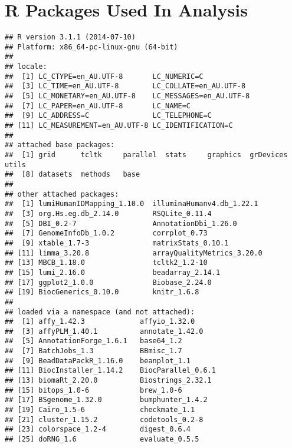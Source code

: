 \documentclass{article}\usepackage{knitr}
\begin{document}
\section*{R Packages Used In Analysis}
\begin{knitrout}\footnotesize
{}\color{fgcolor}\begin{kframe}
\begin{alltt}
\hlstd{()}
\end{alltt}
\begin{verbatim}
## R version 3.1.1 (2014-07-10)
## Platform: x86_64-pc-linux-gnu (64-bit)
## 
## locale:
##  [1] LC_CTYPE=en_AU.UTF-8       LC_NUMERIC=C              
##  [3] LC_TIME=en_AU.UTF-8        LC_COLLATE=en_AU.UTF-8    
##  [5] LC_MONETARY=en_AU.UTF-8    LC_MESSAGES=en_AU.UTF-8   
##  [7] LC_PAPER=en_AU.UTF-8       LC_NAME=C                 
##  [9] LC_ADDRESS=C               LC_TELEPHONE=C            
## [11] LC_MEASUREMENT=en_AU.UTF-8 LC_IDENTIFICATION=C       
## 
## attached base packages:
##  [1] grid      tcltk     parallel  stats     graphics  grDevices utils    
##  [8] datasets  methods   base     
## 
## other attached packages:
##  [1] lumiHumanIDMapping_1.10.0  illuminaHumanv4.db_1.22.1 
##  [3] org.Hs.eg.db_2.14.0        RSQLite_0.11.4            
##  [5] DBI_0.2-7                  AnnotationDbi_1.26.0      
##  [7] GenomeInfoDb_1.0.2         corrplot_0.73             
##  [9] xtable_1.7-3               matrixStats_0.10.1        
## [11] limma_3.20.8               arrayQualityMetrics_3.20.0
## [13] MBCB_1.18.0                tcltk2_1.2-10             
## [15] lumi_2.16.0                beadarray_2.14.1          
## [17] ggplot2_1.0.0              Biobase_2.24.0            
## [19] BiocGenerics_0.10.0        knitr_1.6.8               
## 
## loaded via a namespace (and not attached):
##  [1] affy_1.42.3             affyio_1.32.0          
##  [3] affyPLM_1.40.1          annotate_1.42.0        
##  [5] AnnotationForge_1.6.1   base64_1.2             
##  [7] BatchJobs_1.3           BBmisc_1.7             
##  [9] BeadDataPackR_1.16.0    beanplot_1.1           
## [11] BiocInstaller_1.14.2    BiocParallel_0.6.1     
## [13] biomaRt_2.20.0          Biostrings_2.32.1      
## [15] bitops_1.0-6            brew_1.0-6             
## [17] BSgenome_1.32.0         bumphunter_1.4.2       
## [19] Cairo_1.5-6             checkmate_1.1          
## [21] cluster_1.15.2          codetools_0.2-8        
## [23] colorspace_1.2-4        digest_0.6.4           
## [25] doRNG_1.6               evaluate_0.5.5         

\end{verbatim}
\end{kframe}
\end{knitrout}
\end{document}

